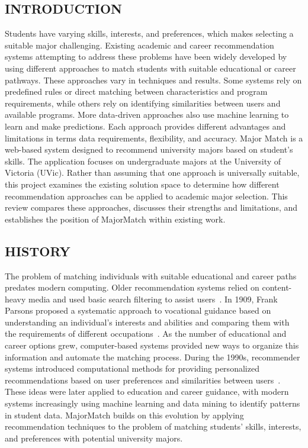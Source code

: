 \documentclass[sigconf]{acmart}
\begin{document}
\subsection{INTRODUCTION}
Students have varying skills, interests, and preferences, which makes selecting a suitable major challenging. Existing academic and career recommendation systems attempting to address these problems have been widely developed by using different approaches to match students with suitable educational or career pathways. These approaches vary in techniques and results. Some systems rely on predefined rules or direct matching between characteristics and program requirements, while others rely on identifying similarities between users and available programs. More data-driven approaches also use machine learning to learn and make predictions. Each approach provides different advantages and limitations in terms data requirements, flexibility, and accuracy. Major Match is a web-based system designed to recommend university majors based on student's skills. The application focuses on undergraduate majors at the University of Victoria (UVic). Rather than assuming that one approach is universally suitable, this project examines the existing solution space to determine how different recommendation approaches can be applied to academic major selection. This review compares these approaches, discusses their strengths and limitations, and establishes the position of MajorMatch within existing work.

\subsection{HISTORY}
The problem of matching individuals with suitable educational and career paths predates modern computing. Older recommendation systems relied on content-heavy media and used basic search filtering to assist users~\cite{rances}. In 1909, Frank Parsons proposed a systematic approach to vocational guidance based on understanding an individual's interests and abilities and comparing them with the requirements of different occupations~\cite{parsons}. As the number of educational and career options grew, computer-based systems provided new ways to organize this information and automate the matching process. During the 1990s, recommender systems introduced computational methods for providing personalized recommendations based on user preferences and similarities between users~\cite{resnick1994,resnick1997}. These ideas were later applied to education and career guidance, with modern systems increasingly using machine learning and data mining to identify patterns in student data. MajorMatch builds on this evolution by applying recommendation techniques to the problem of matching students' skills, interests, and preferences with potential university majors.
\end{document}
